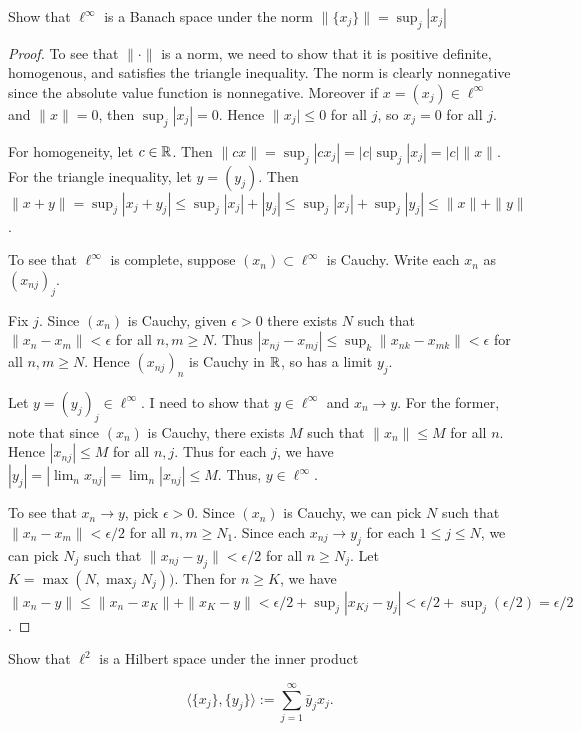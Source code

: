 \documentclass{article}
\begin{document}
 Show that $\ell^\infty$ is a Banach space under the norm
  $\|\{x_j\}\|= \sup_j |x_j|$

\begin{proof}
To see that $\|\cdot\|$ is a norm, we need to show that it is positive definite, homogenous, and satisfies the triangle inequality. The norm is clearly nonnegative since the absolute value function is nonnegative.  Moreover if $x = (x_j) \in \ell^\infty$ and $\|x\| = 0$, then $\sup_j |x_j| = 0$. Hence $\|x_j| \le 0$ for all $j$, so $x_j = 0$ for all $j$.

For homogeneity, let $c \in \mathbb{R}$.  Then $\|c x\| = \sup_j |c x_j| = |c| \sup_j |x_j| = |c| \|x\|$.  For the triangle inequality, let $y = (y_j)$.  Then $\|x + y \| = \sup_j |x_j + y_j| \le \sup_j |x_j| + |y_j| \le \sup_j |x_j| + \sup_j |y_j| \le \|x\| + \|y\|$.

To see that $\ell^\infty$ is complete, suppose $(x_n) \subset \ell^\infty$ is Cauchy.  Write each $x_n$ as $(x_{nj})_j$.  

Fix $j$. Since $(x_n)$ is Cauchy, given $\epsilon > 0$ there exists $N$ such that $\|x_n - x_m \| < \epsilon$ for all $n,m \ge N$.  Thus $|x_{nj} - x_{mj}| \le \sup_k \|x_{nk} - x_{mk} \| < \epsilon$ for all $n,m \ge N$.  Hence $(x_{nj})_n$ is Cauchy in $\mathbb{R}$, so has a limit $y_j$. 

Let $y = (y_j)_j \in \ell^\infty$.  I need to show that $y \in \ell^\infty$ and $x_n \to y$.  For the former, note that since $(x_n)$ is Cauchy, there exists $M$ such that $\|x_n\| \le M$ for all $n$.  Hence $|x_{nj}| \le M$ for all $n, j$.  Thus for each $j$, we have $|y_j| = |\lim_n x_{nj}| = \lim_n |x_{nj}| \le M$. Thus, $y \in \ell^\infty$.  

To see that $x_n \to y$, pick $\epsilon > 0$.  Since $(x_n)$ is Cauchy, we can pick $N$ such that $\|x_n - x_m\| < \epsilon/2$ for all $n,m \ge N_1$. Since each $x_{nj} \to y_j$ for each $1 \le j \le N$, we can pick $N_j$ such that $\|x_{nj} - y_j \| < \epsilon/2$ for all $n \ge N_j$.  Let $K = \max(N, \max_j N_j))$.  Then for $n \ge K$, we have $\|x_n - y \| \le \|x_n - x_K\| + \|x_K - y\| < \epsilon/2 + \sup_j |x_{Kj} - y_j| < \epsilon/2 + \sup_j (\epsilon/2) = \epsilon/2$.
\end{proof}

 Show that $\ell^2$ is a Hilbert space under the inner product 

\[
\langle \{x_j\},\{y_j\} \rangle :=\sum_{j=1}^\infty \bar y_j x_j.
\]
\end{document}
